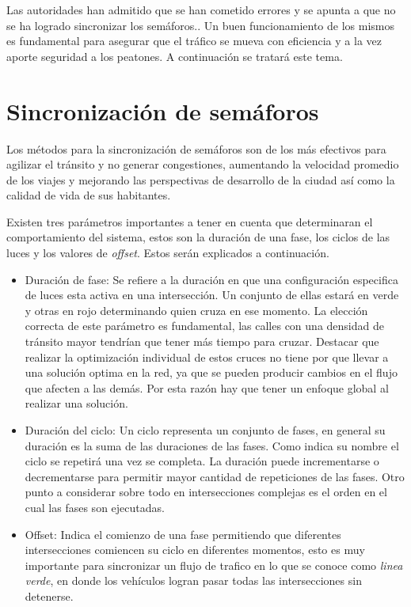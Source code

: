 Las autoridades han admitido que se han cometido errores y se apunta a que no se ha logrado sincronizar los semáforos.\citep{olivera2013}. Un buen funcionamiento de los mismos es fundamental para asegurar que el tráfico se mueva con eficiencia y a la vez aporte seguridad a los peatones. A continuación se tratará este tema. 


\section{Sincronización de semáforos}


Los métodos para la sincronización de semáforos son de los más efectivos para agilizar el tránsito y no generar congestiones, aumentando la velocidad promedio de los viajes y mejorando las perspectivas de desarrollo de la ciudad así como la calidad de vida de sus habitantes. 

Existen tres parámetros importantes a tener en cuenta que determinaran el comportamiento del sistema, estos son la duración de una fase, los ciclos de las luces y los valores de \emph{offset}. Estos serán explicados a continuación.


\begin{itemize}
 	\item Duración de fase: Se refiere a la duración en que una configuración especifica de luces esta activa en una intersección. Un conjunto de ellas estará en verde y otras en rojo determinando quien cruza en ese momento. La elección correcta de este parámetro es fundamental, las calles con una densidad de tránsito mayor tendrían que tener más tiempo para cruzar. Destacar que realizar la optimización individual de estos cruces no tiene por que llevar a una solución optima en la red, ya que se pueden producir cambios en el flujo que afecten a las demás. Por esta razón hay que tener un enfoque global al realizar una solución.
 	
 	\item Duración del ciclo: Un ciclo representa un conjunto de fases, en general su duración es la suma de las duraciones de las fases. Como indica su nombre el ciclo se repetirá una vez se completa. La duración puede incrementarse o decrementarse para permitir mayor cantidad de repeticiones de las fases. Otro punto a considerar sobre todo en intersecciones complejas es el orden en el cual las fases son ejecutadas.
 	
 	\item Offset: Indica el comienzo de una fase permitiendo que diferentes intersecciones comiencen su ciclo en diferentes momentos, esto es muy importante para sincronizar un flujo de trafico en lo que se conoce como \emph{linea verde}, en donde los vehículos logran pasar todas las intersecciones sin detenerse.
\end{itemize}

